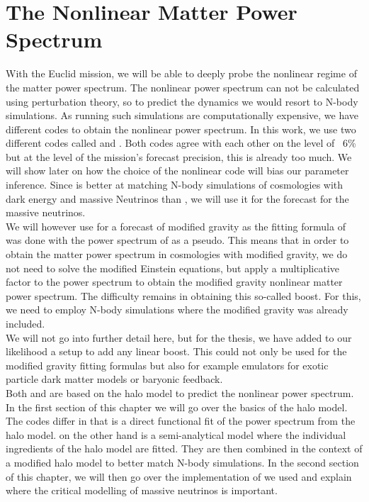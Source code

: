 \documentclass[../main.tex]{subfiles}
\begin{document}
 \chapter{The Nonlinear Matter Power Spectrum}\label{cha:NL}
With the Euclid mission, we will be able to deeply probe the nonlinear regime of the matter power spectrum. The nonlinear power spectrum can not be calculated using perturbation theory, so to predict the dynamics we would resort to N-body simulations. As running such simulations are computationally expensive, we have different codes to obtain the nonlinear power spectrum. In this work, we use two different codes called \halofit\cite{Mead:2020vgs} and \hmcode\cite{Takahashi:2019hth}. Both codes agree with each other on the level of ~6\% but at the level of the \Euclid mission's forecast precision, this is already too much. We will show later on how the choice of the nonlinear code will bias our parameter inference. Since \hmcode is better at matching N-body simulations of cosmologies with dark energy and massive Neutrinos than \halofit, we will use it for the forecast for the massive neutrinos.\\
We will however use \halofit for a forecast of modified gravity as the fitting formula of \cite{Winther_2019} was done with the power spectrum of \halofit as a pseudo. This means that in order to obtain the matter power spectrum in cosmologies with modified gravity, we do not need to solve the modified Einstein equations, but apply a multiplicative factor to the power spectrum to obtain the modified gravity nonlinear matter power spectrum. The difficulty remains in obtaining this so-called boost. For this, we need to employ N-body simulations where the modified gravity was already included.\\
We will not go into further detail here, but for the thesis, we have added to our likelihood a setup to add any linear boost. This could not only be used for the modified gravity fitting formulas but also for example emulators for exotic particle dark matter models or baryonic feedback.\\
Both \hmcode and \halofit are based on the halo model to predict the nonlinear power spectrum. In the first section of this chapter we will go over the basics of the halo model.\\
The codes differ in that \halofit is a direct functional fit of the power spectrum from the halo model. \hmcode on the other hand is a semi-analytical model where the individual ingredients of the halo model are fitted. They are then combined in the context of a modified halo model to better match N-body simulations. In the second section of this chapter, we will then go over the implementation of \hmcode we used and explain where the critical modelling of massive neutrinos is important.\\
\end{document}
